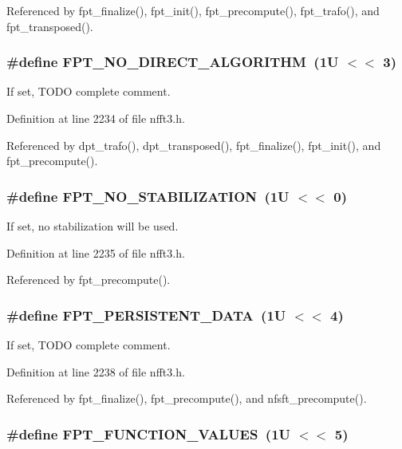 Referenced by fpt\_\-finalize(), fpt\_\-init(), fpt\_\-precompute(), fpt\_\-trafo(), and fpt\_\-transposed().\hypertarget{group__fpt_gdbf3440a08ccd763556ff4caa36693d9}{
\subsubsection{\setlength{\rightskip}{0pt plus 5cm}\#define FPT\_\-NO\_\-DIRECT\_\-ALGORITHM~(1U $<$$<$ 3)}}
\label{group__fpt_gdbf3440a08ccd763556ff4caa36693d9}


If set, TODO complete comment. 



Definition at line 2234 of file nfft3.h.

Referenced by dpt\_\-trafo(), dpt\_\-transposed(), fpt\_\-finalize(), fpt\_\-init(), and fpt\_\-precompute().\hypertarget{group__fpt_g43cffc40fea4280ae0bcbe948109a3be}{
\subsubsection{\setlength{\rightskip}{0pt plus 5cm}\#define FPT\_\-NO\_\-STABILIZATION~(1U $<$$<$ 0)}}
\label{group__fpt_g43cffc40fea4280ae0bcbe948109a3be}


If set, no stabilization will be used. 



Definition at line 2235 of file nfft3.h.

Referenced by fpt\_\-precompute().\hypertarget{group__fpt_g1ee771544214aba96ee012095feeead1}{
\subsubsection{\setlength{\rightskip}{0pt plus 5cm}\#define FPT\_\-PERSISTENT\_\-DATA~(1U $<$$<$ 4)}}
\label{group__fpt_g1ee771544214aba96ee012095feeead1}


If set, TODO complete comment. 



Definition at line 2238 of file nfft3.h.

Referenced by fpt\_\-finalize(), fpt\_\-precompute(), and nfsft\_\-precompute().\hypertarget{group__fpt_gd5594ac14b8a368f0103761361af5691}{
\subsubsection{\setlength{\rightskip}{0pt plus 5cm}\#define FPT\_\-FUNCTION\_\-VALUES~(1U $<$$<$ 5)}}
\label{group__fpt_gd5594ac14b8a368f0103761361af5691}


